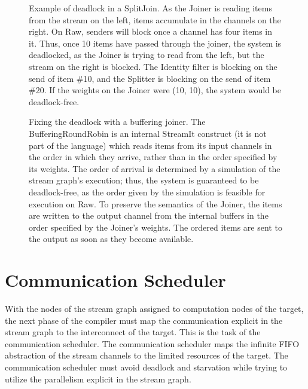 \begin{figure}
\centering
{}
\parbox{6in}{\caption{\protect\small Example of deadlock in a
SplitJoin.  As the Joiner is reading items from the stream on the
left, items accumulate in the channels on the right.  On Raw, senders
will block once a channel has four items in it.  Thus, once 10 items
have passed through the joiner, the system is deadlocked, as the
Joiner is trying to read from the left, but the stream on the right is
blocked.  The Identity filter is blocking on the send of item \#10,
and the Splitter is blocking on the send of item \#20.  If the weights
on the Joiner were (10, 10), the system would be deadlock-free.
\protect\label{fig:joiner-dead}}}

\vspace{48pt}

\caption{\protect\small Fixing the deadlock with a buffering joiner.
The BufferingRoundRobin is an internal StreamIt construct (it is not
part of the language) which reads items from its input channels in the
order in which they arrive, rather than in the order specified by its
weights.  The order of arrival is determined by a simulation of the
stream graph's execution; thus, the system is guaranteed to be
deadlock-free, as the order given by the simulation is feasible for
execution on Raw.  To preserve the semantics of the Joiner, the items
are written to the output channel from the internal buffers in the
order specified by the Joiner's weights.  The ordered items are sent
to the output as soon as they become available.
\protect\label{fig:joiner-live}}
\end{figure}

\section{Communication Scheduler}
\label{sec:communic}

With the nodes of the stream graph assigned to computation nodes of
the target, the next phase of the compiler must map the communication
explicit in the stream graph to the interconnect of the target.  This
is the task of the communication scheduler.  The communication
scheduler maps the infinite FIFO abstraction of the stream channels to
the limited resources of the target.  The communication scheduler must
avoid deadlock and starvation while trying to utilize the parallelism
explicit in the stream graph.

